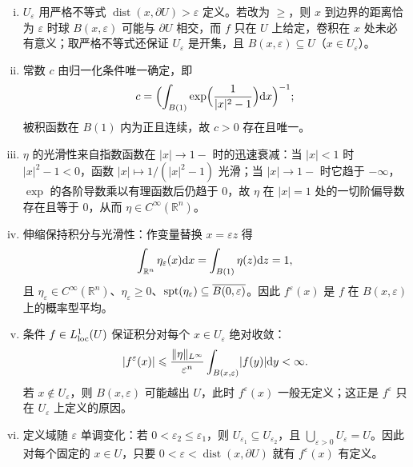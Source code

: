 \documentclass[../../main.tex]{subfiles}%
\begin{document}
\begin{remark}\label{remark:ch04-def-4-2-记号-条件}
\begin{enumerate}[(i)]
\item $U_\varepsilon$ 用严格不等式 $\operatorname{dist}(x,\partial U)>\varepsilon$ 定义。若改为 $\geqslant$，则 $x$ 到边界的距离恰为 $\varepsilon$ 时球 $B(x,\varepsilon)$ 可能与 $\partial U$ 相交，而 $f$ 只在 $U$ 上给定，卷积在 $x$ 处未必有意义；取严格不等式还保证 $U_\varepsilon$ 是开集，且 $B(x,\varepsilon)\subseteq U$（$x\in U_\varepsilon$）。
\item 常数 $c$ 由归一化条件唯一确定，即
\begin{align*}
c=\Bigl(\int_{B(1)}\exp\Bigl(\frac{1}{\lvert x\rvert^2-1}\Bigr)\mathrm{d} x\Bigr)^{-1};
\end{align*}
被积函数在 $B(1)$ 内为正且连续，故 $c>0$ 存在且唯一。
\item $\eta$ 的光滑性来自指数函数在 $\lvert x\rvert\to1-$ 时的迅速衰减：当 $\lvert x\rvert<1$ 时 $\lvert x\rvert^2-1<0$，函数 $\lvert x\rvert\mapsto1/(\lvert x\rvert^2-1)$ 光滑；当 $\lvert x\rvert\to1-$ 时它趋于 $-\infty$，$\exp$ 的各阶导数乘以有理函数后仍趋于 $0$，故 $\eta$ 在 $\lvert x\rvert=1$ 处的一切阶偏导数存在且等于 $0$，从而 $\eta\in C^\infty(\mathbb{R}^n)$。
\item 伸缩保持积分与光滑性：作变量替换 $x=\varepsilon z$ 得
\begin{align*}
\int_{\mathbb{R}^n}\eta_\varepsilon(x)\mathrm{d} x=\int_{B(1)}\eta(z)\mathrm{d} z=1,
\end{align*}
且 $\eta_\varepsilon\in C^\infty(\mathbb{R}^n)$、$\eta_\varepsilon\geqslant0$、$\operatorname{spt}(\eta_\varepsilon)\subseteq\overline{B(0,\varepsilon)}$。因此 $f^\varepsilon(x)$ 是 $f$ 在 $B(x,\varepsilon)$ 上的概率型平均。
\item 条件 $f\in L^1_{\mathrm{loc}}(U)$ 保证积分对每个 $x\in U_\varepsilon$ 绝对收敛：
\begin{align*}
\lvert f^\varepsilon(x)\rvert\leqslant\frac{\lVert\eta\rVert_{L^\infty}}{\varepsilon^n}\int_{B(x,\varepsilon)}\lvert f(y)\rvert\mathrm{d} y<\infty .
\end{align*}
若 $x\notin U_\varepsilon$，则 $B(x,\varepsilon)$ 可能越出 $U$，此时 $f^\varepsilon(x)$ 一般无定义；这正是 $f^\varepsilon$ 只在 $U_\varepsilon$ 上定义的原因。
\item 定义域随 $\varepsilon$ 单调变化：若 $0<\varepsilon_2\leqslant\varepsilon_1$，则 $U_{\varepsilon_1}\subseteq U_{\varepsilon_2}$，且 $\bigcup_{\varepsilon>0}U_\varepsilon=U$。因此对每个固定的 $x\in U$，只要 $0<\varepsilon<\operatorname{dist}(x,\partial U)$ 就有 $f^\varepsilon(x)$ 有定义。
\end{enumerate}
\end{remark}
\end{document}
